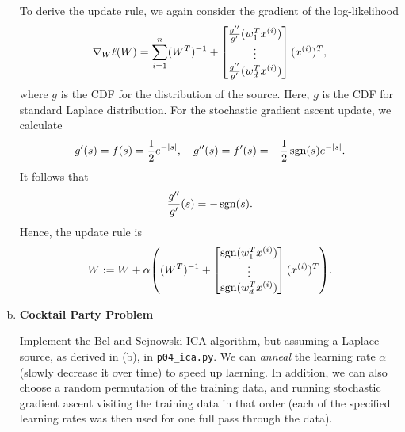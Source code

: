 \documentclass[12pt,letterpaper,boxed]{hmcpset}
\begin{document}
\begin{solution}
\begin{enumerate}[(a)]
    To derive the update rule, we again consider the gradient of the log-likelihood 
    \[
    \nabla_W \ell(W) = \sum_{i=1}^n (W^{T})^{-1} + \begin{bmatrix}
      \frac{g''}{g'} (w_1^T \xx) \\
      \vdots \\
      \frac{g''}{g'} (w_d^T \xx)
    \end{bmatrix}
    (\xx)^T,
    \]
    where $g$ is the CDF for the distribution of the source. Here, $g$ is the CDF for standard Laplace distribution. For the stochastic gradient ascent update, we calculate
    \[
    g'(s) = f(s) = \frac{1}{2} e^{-\left\lvert s\right\rvert}, \quad 
    g''(s) = f'(s) = - \frac{1}{2} \operatorname{sgn}(s) e^{- \left\lvert s\right\rvert}.
    \]
    It follows that
    \[
    \frac{g''}{g'}(s) = - \operatorname{sgn}(s).
    \]
    Hence, the update rule is
    \[
    W := W + \alpha \qty( (W^T)^{-1} + 
      \begin{bmatrix}
        \sgn(w_1^T \xx) \\
        \vdots \\
        \sgn(w_d^T \xx)
      \end{bmatrix}
      (\xx)^T
    ).
    \]

    \item \textbf{Cocktail Party Problem}
    
    Implement the Bel and Sejnowski ICA algorithm, but assuming a Laplace source, as derived in (b), in \verb|p04_ica.py|. We can \emph{anneal} the learning rate $\alpha$ (slowly decrease it over time) to speed up laerning. In addition, we can also choose a random permutation of the training data, and running stochastic gradient ascent visiting the training data in that order (each of the specified learning rates was then used for one full pass through the data).
  \end{enumerate}
\end{solution}
\end{document}
